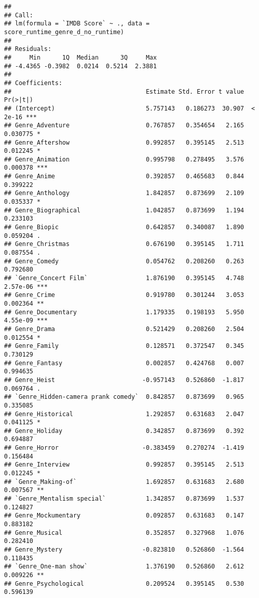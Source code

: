 \documentclass[
]{article}
\begin{document}
\begin{verbatim}
## 
## Call:
## lm(formula = `IMDB Score` ~ ., data = score_runtime_genre_d_no_runtime)
## 
## Residuals:
##     Min      1Q  Median      3Q     Max 
## -4.4365 -0.3982  0.0214  0.5214  2.3881 
## 
## Coefficients:
##                                     Estimate Std. Error t value Pr(>|t|)    
## (Intercept)                         5.757143   0.186273  30.907  < 2e-16 ***
## Genre_Adventure                     0.767857   0.354654   2.165 0.030775 *  
## Genre_Aftershow                     0.992857   0.395145   2.513 0.012245 *  
## Genre_Animation                     0.995798   0.278495   3.576 0.000378 ***
## Genre_Anime                         0.392857   0.465683   0.844 0.399222    
## Genre_Anthology                     1.842857   0.873699   2.109 0.035337 *  
## Genre_Biographical                  1.042857   0.873699   1.194 0.233103    
## Genre_Biopic                        0.642857   0.340087   1.890 0.059204 .  
## Genre_Christmas                     0.676190   0.395145   1.711 0.087554 .  
## Genre_Comedy                        0.054762   0.208260   0.263 0.792680    
## `Genre_Concert Film`                1.876190   0.395145   4.748 2.57e-06 ***
## Genre_Crime                         0.919780   0.301244   3.053 0.002364 ** 
## Genre_Documentary                   1.179335   0.198193   5.950 4.55e-09 ***
## Genre_Drama                         0.521429   0.208260   2.504 0.012554 *  
## Genre_Family                        0.128571   0.372547   0.345 0.730129    
## Genre_Fantasy                       0.002857   0.424768   0.007 0.994635    
## Genre_Heist                        -0.957143   0.526860  -1.817 0.069764 .  
## `Genre_Hidden-camera prank comedy`  0.842857   0.873699   0.965 0.335085    
## Genre_Historical                    1.292857   0.631683   2.047 0.041125 *  
## Genre_Holiday                       0.342857   0.873699   0.392 0.694887    
## Genre_Horror                       -0.383459   0.270274  -1.419 0.156484    
## Genre_Interview                     0.992857   0.395145   2.513 0.012245 *  
## `Genre_Making-of`                   1.692857   0.631683   2.680 0.007567 ** 
## `Genre_Mentalism special`           1.342857   0.873699   1.537 0.124827    
## Genre_Mockumentary                  0.092857   0.631683   0.147 0.883182    
## Genre_Musical                       0.352857   0.327968   1.076 0.282410    
## Genre_Mystery                      -0.823810   0.526860  -1.564 0.118435    
## `Genre_One-man show`                1.376190   0.526860   2.612 0.009226 ** 
## Genre_Psychological                 0.209524   0.395145   0.530 0.596139    

\end{verbatim}
\end{document}
